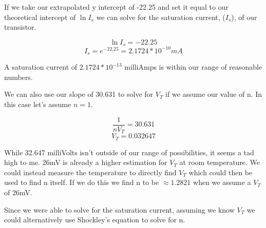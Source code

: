 \documentclass[prb,preprint]{revtex4-1}
\begin{document}
If we take our extrapolated y intercept of -22.25 and set it equal to our theoretical intercept of $\ln{I_{s}}$ we can solve for the saturation current, ($I_{s}$), of our transistor.

\begin{equation}
\ln{I_{s}} = -22.25
\end{equation}
\begin{equation}
I_{s} = e^{-22.25} = 2.1724*10^{-10} mA
\end{equation}

A saturation current of $2.1724*10^{-13}$ milliAmps is within our range of reasonable numbers.

We can also use our slope of 30.631 to solve for $V_{T}$ if we assume our value of n. In this case let's assume $n=1$.

\begin{equation}
\frac{1}{nV_{T}} = 30.631
\end{equation}
\begin{equation}
V_{T} = 0.032647
\end{equation}

While 32.647 milliVolts isn't outside of our range of possibilities, it seems a tad high to me. 26mV is already a higher estimation for $V_{T}$ at room temperature. We could instead measure the temperature to directly find $V_{T}$ which could then be used to find n itself. If we do this we find n to be $\approx1.2821$ when we assume a $V_{T}$ of 26mV.

Since we were able to solve for the saturation current, assuming we know $V_{T}$ we could alternatively use Shockley's equation to solve for n.

\end{document}
